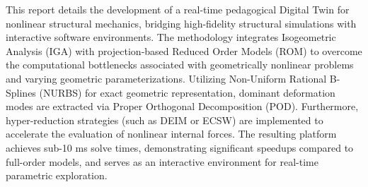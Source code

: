 This report details the development of a real-time pedagogical Digital Twin for nonlinear structural mechanics, bridging high-fidelity structural simulations with interactive software environments. The methodology integrates Isogeometric Analysis (IGA) with projection-based Reduced Order Models (ROM) to overcome the computational bottlenecks associated with geometrically nonlinear problems and varying geometric parameterizations. Utilizing Non-Uniform Rational B-Splines (NURBS) for exact geometric representation, dominant deformation modes are extracted via Proper Orthogonal Decomposition (POD). Furthermore, hyper-reduction strategies (such as DEIM or ECSW) are implemented to accelerate the evaluation of nonlinear internal forces. The resulting platform achieves sub-10 ms solve times, demonstrating significant speedups compared to full-order models, and serves as an interactive environment for real-time parametric exploration.